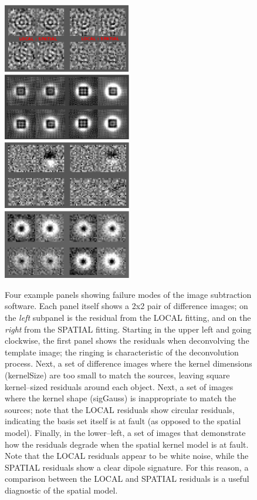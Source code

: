 \documentclass[prd, nofootinbib, floatfix, 11pt,tightenlines,times]{article}
\begin{document}
\begin{figure}
\includegraphics[width=0.5\textwidth, height=0.25\textwidth]{figures/deconv2.eps} 
\includegraphics[width=0.5\textwidth, height=0.25\textwidth]{figures/size2.eps} \\
\includegraphics[width=0.5\textwidth, height=0.25\textwidth]{figures/order2.eps} 
\includegraphics[width=0.5\textwidth, height=0.25\textwidth]{figures/shape2.eps} \\
\caption{Four example panels showing failure modes of the image
  subtraction software.  Each panel itself shows a 2x2 pair of
  difference images; on the {\it left} subpanel is the residual from
  the LOCAL fitting, and on the {\it right} from the SPATIAL fitting.
  Starting in the upper left and going clockwise, the first panel
  shows the residuals when deconvolving the template image; the
  ringing is characteristic of the deconvolution process.  Next, a set
  of difference images where the kernel dimensions (kernelSize) are
  too small to match the sources, leaving square kernel--sized
  residuals around each object.  Next, a set of images where the
  kernel shape (sigGauss) is inappropriate to match the sources; note
  that the LOCAL residuals show circular residuals, indicating the
  basis set itself is at fault (as opposed to the spatial model).
  Finally, in the lower--left, a set of images that demonstrate how
  the residuals degrade when the spatial kernel model is at fault.
  Note that the LOCAL residuals appear to be white noise, while the
  SPATIAL residuals show a clear dipole signature.  For this reason, a
  comparison between the LOCAL and SPATIAL residuals is a useful
  diagnostic of the spatial model.  }
\label{fig_galleryBad}
\end{figure}
\end{document}
